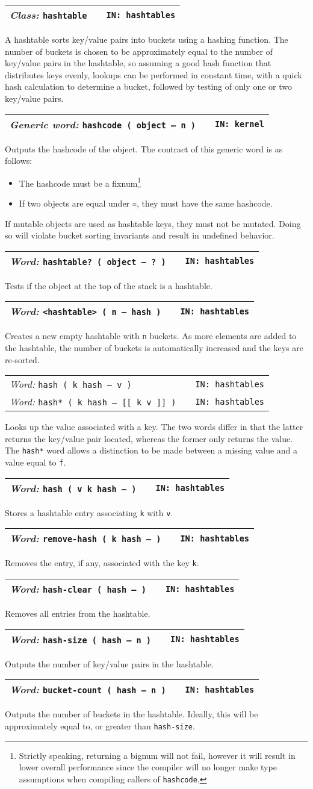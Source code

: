\documentclass{report}
\newcommand{\ordinaryword}[3]{\index{#1}
\emph{Word:} \texttt{#2} &&\texttt{IN: #3}}
\newcommand{\classword}[2]{\index{#1}
\emph{Class:} \texttt{#1} &&\texttt{IN: #2}}
\newcommand{\genericword}[3]{\index{#1}
\emph{Generic word:} \texttt{#2} &&\texttt{IN: #3}}
\newcommand{\wordtable}[1]{

\begin{tabularx}{12cm}[t]{lXr}
\hline
#1\\
\hline
\end{tabularx}

}
\begin{document}
\hashglos
{}
\wordtable{
\classword{hashtable}{hashtables}
}
A hashtable sorts key/value pairs into buckets using a hashing function. The number of buckets is chosen to be approximately equal to the number of key/value pairs in the hashtable, so assuming a good hash function that distributes keys evenly, lookups can be performed in constant time, with a quick hash calculation to determine a bucket, followed by testing of only one or two key/value pairs.
\wordtable{
\genericword{hashcode}{hashcode~( object -- n )}{kernel}
}
Outputs the hashcode of the object. The contract of this generic word is as follows:
\begin{itemize}
\item The hashcode must be a fixnum\footnote{Strictly speaking, returning a bignum will not fail, however it will result in lower overall performance since the compiler will no longer make type assumptions when compiling callers of \texttt{hashcode}.}
\item If two objects are equal under \texttt{=}, they must have the same hashcode.
\end{itemize}
If mutable objects are used as hashtable keys, they must not be mutated. Doing so will violate bucket sorting invariants and result in undefined behavior.

\wordtable{
\ordinaryword{hashtable?}{hashtable?~( object -- ?~)}{hashtables}
}
Tests if the object at the top of the stack is a hashtable.
\wordtable{
\ordinaryword{<hashtable>}{<hashtable>~( n -- hash )}{hashtables}
}
Creates a new empty hashtable with \texttt{n} buckets. As more elements are added to the hashtable, the number of buckets is automatically increased and the keys are re-sorted.
\wordtable{
\ordinaryword{hash}{hash ( k hash -- v )}{hashtables}\\
\ordinaryword{hash*}{hash* ( k hash -- [[ k v ]] )}{hashtables}
}
Looks up the value associated with a key. The two words differ in that the latter returns the key/value pair located, whereas the former only returns the value. The \texttt{hash*} word allows a distinction to be made between a missing value and a value equal to \texttt{f}.
\wordtable{
\ordinaryword{set-hash}{hash ( v k hash -- )}{hashtables}
}
Stores a hashtable entry associating \texttt{k} with \texttt{v}.
\wordtable{
\ordinaryword{remove-hash}{remove-hash ( k hash -- )}{hashtables}
}
Removes the entry, if any, associated with the key \texttt{k}.
\wordtable{
\ordinaryword{hash-clear}{hash-clear ( hash -- )}{hashtables}
}
Removes all entries from the hashtable.
\wordtable{
\ordinaryword{hash-size}{hash-size ( hash -- n )}{hashtables}
}
Outputs the number of key/value pairs in the hashtable.
\wordtable{
\ordinaryword{bucket-count}{bucket-count ( hash -- n )}{hashtables}
}
Outputs the number of buckets in the hashtable. Ideally, this will be approximately equal to, or greater than \texttt{hash-size}.
\end{document}
